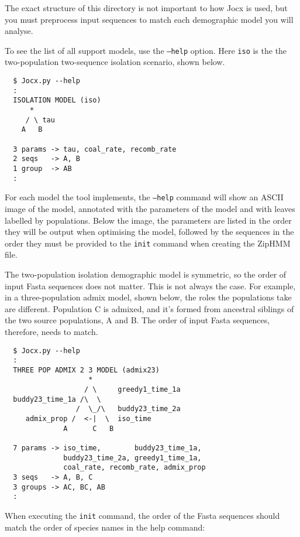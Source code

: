 \documentclass[graybox]{svmult}
\begin{document}
The exact structure of this directory is not important to how Jocx is used, but you must preprocess input sequences to match each demographic model you will analyse.

To see the list of all support models, use the \texttt{--help} option. Here \texttt{iso} is the the two-population two-sequence isolation scenario, shown below.

{\small{}\begin{verbatim}
  $ Jocx.py --help
  :
  ISOLATION MODEL (iso)
      *
     / \ tau
    A   B

  3 params -> tau, coal_rate, recomb_rate
  2 seqs   -> A, B
  1 group  -> AB
  :
\end{verbatim}}

For each model the tool implements, the \texttt{--help} command will show an ASCII image of the model, annotated with the parameters of the model and with leaves labelled by populations. Below the image, the parameters are listed in the order they will be output when optimising the model, followed by the sequences in the order they must be provided to the \texttt{init} command when creating the ZipHMM file.

The two-population isolation demographic model is symmetric, so the order of input Fasta sequences does not matter. This is not always the case. For example, in a three-population admix model, shown below, the roles the populations take are different. Population C is admixed, and it's formed from ancestral siblings of the two source populations, A and B. The order of input Fasta sequences, therefore, needs to match.

{\small{}\begin{verbatim}
  $ Jocx.py --help
  :
  THREE POP ADMIX 2 3 MODEL (admix23)
                    *
                   / \     greedy1_time_1a
  buddy23_time_1a /\  \
                 /  \_/\   buddy23_time_2a
     admix_prop /  <-|  \  iso_time
              A      C   B

  7 params -> iso_time,        buddy23_time_1a,
              buddy23_time_2a, greedy1_time_1a,
              coal_rate, recomb_rate, admix_prop
  3 seqs   -> A, B, C
  3 groups -> AC, BC, AB
  :
\end{verbatim}}

When executing the \texttt{init} command, the order of the Fasta sequences should match the order of species names in the help command:
\end{document}
